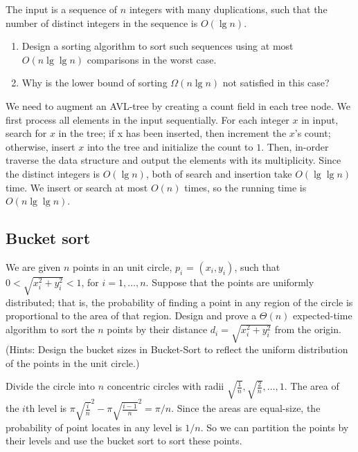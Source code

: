 \begin{Exercise}
The input is a sequence of $n$ integers with many duplications, such that the number of distinct integers in the sequence is $O(\lg n)$.
\begin{enumerate}
\item Design a sorting algorithm to sort such sequences using at most $O(n \lg \lg n)$ comparisons in the worst case.
\item Why is the lower bound of sorting $\Omega(n \lg n)$ not satisfied in this case? 
\end{enumerate}
\end{Exercise}
\begin{Answer}
We need to augment an AVL-tree by creating a count field in each tree node. We first process all elements in the input sequentially. For each integer $x$ in input, search for $x$ in the tree; if x has been inserted, then increment the $x$'s count; otherwise, insert $x$ into the tree and initialize the count to $1$. Then, in-order traverse the data structure and output the elements with its multiplicity. Since the distinct integers is $O(\lg n)$, both of search and insertion take $O(\lg \lg n)$ time. We insert or search at most $O(n)$ times, so the running time is $O(n \lg \lg n)$.
\end{Answer}

\subsection{Bucket sort}
\begin{Exercise}
We are given $n$ points in an unit circle, $ p_i$ = $(x_i, y_i)$, such that $0 < \sqrt{x_i^2 + y_i^2} < 1$, for $i = 1, \dots, n$. Suppose that the points are uniformly distributed; that is, the probability of finding a point in any region of the circle is proportional to the area of that region. Design and prove a $\Theta(n)$ expected-time algorithm to sort the $n$ points by their distance $d_i = \sqrt{x_i^2 + y_i^2}$ from the origin. (Hints: Design the bucket sizes in Bucket-Sort to reflect the uniform distribution of the points in the unit circle.) 
\end{Exercise}
\begin{Answer}
Divide the circle into $n$ concentric circles with radii $\sqrt{\frac{1}{n}}, \sqrt{\frac{2}{n}}, \dots, 1$. The area of the $i$th level is $\pi {\sqrt{\frac{i}{n}}}^2 - \pi {\sqrt{\frac{i-1}{n}}}^2 = \pi/n$. Since the areas are equal-size, the probability of point locates in any level is $1/n$. So we can partition the points by their levels and use the bucket sort to sort these points.
\end{Answer}

